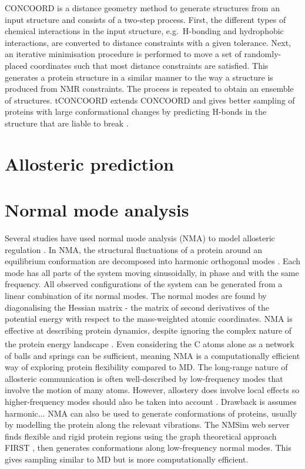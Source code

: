CONCOORD \cite{DeGroot1997, DeGroot1999} is a distance geometry method to generate structures from an input structure and consists of a two-step process.
First, the different types of chemical interactions in the input structure, e.g.\ H-bonding and hydrophobic interactions, are converted to distance constraints with a given tolerance.
Next, an iterative minimisation procedure is performed to move a set of randomly-placed coordinates such that most distance constraints are satisfied.
This generates a protein structure in a similar manner to the way a structure is produced from NMR constraints.
The process is repeated to obtain an ensemble of structures.
tCONCOORD extends CONCOORD and gives better sampling of proteins with large conformational changes by predicting H-bonds in the structure that are liable to break \cite{Seeliger2007}.


\section{Allosteric prediction}


\section{Normal mode analysis}

Several studies have used normal mode analysis (NMA) to model allosteric regulation \cite{Mitternacht2011, Panjkovich2012, Balabin2009, Rodgers2013, Zheng2007}.
In NMA, the structural fluctuations of a protein around an equilibrium conformation are decomposed into harmonic orthogonal modes \cite{Hayward2008}.
Each mode has all parts of the system moving sinusoidally, in phase and with the same frequency.
All observed configurations of the system can be generated from a linear combination of its normal modes.
The normal modes are found by diagonalising the Hessian matrix - the matrix of second derivatives of the potential energy with respect to the mass-weighted atomic coordinates.
NMA is effective at describing protein dynamics, despite ignoring the complex nature of the protein energy landscape \cite{Bahar2005}.
Even considering the C\textsuperscript{\textalpha} atoms alone as a network of balls and springs can be sufficient, meaning NMA is a computationally efficient way of exploring protein flexibility compared to MD.
The long-range nature of allosteric communication is often well-described by low-frequency modes that involve the motion of many atoms.
However, allostery does involve local effects so higher-frequency modes should also be taken into account \cite{Collier2013}.
Drawback is assumes harmonic...
NMA can also be used to generate conformations of proteins, usually by modelling the protein along the relevant vibrations.
The NMSim web server \cite{Kruger2012, Ahmed2011} finds flexible and rigid protein regions using the graph theoretical approach FIRST \cite{Jacobs2001}, then generates conformations along low-frequency normal modes.
This gives sampling similar to MD but is more computationally efficient.


